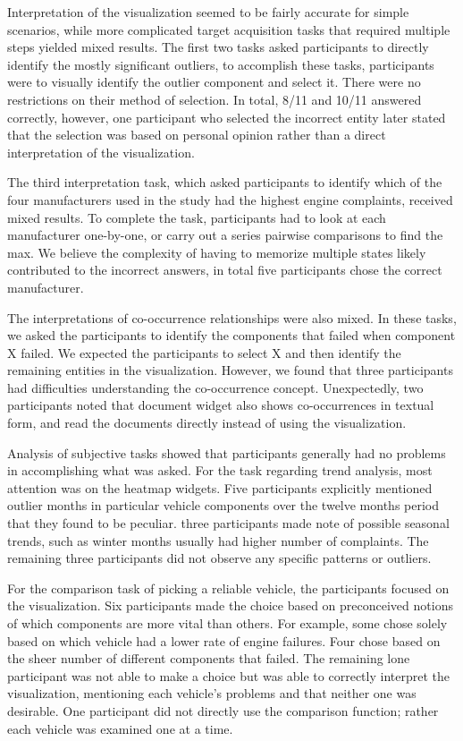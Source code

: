 Interpretation of the \threed visualization seemed to be fairly accurate for
simple scenarios, while more complicated target acquisition tasks that required
multiple steps yielded mixed results. The first two tasks asked
participants to directly identify the mostly significant outliers, to accomplish
these tasks, participants were to visually identify the outlier \threed
component and select it. There were no restrictions on their method of
selection. In total, 8/11 and 10/11 answered correctly, however, one participant
who selected the incorrect entity later stated that the selection was based on
personal opinion rather than a direct interpretation of the visualization.

The third interpretation task, which asked participants to identify which of the four
manufacturers used in the study had the highest engine complaints, received
mixed results. To complete the task, participants had to look at each
manufacturer one-by-one, or carry out a series pairwise comparisons to find the
max. We believe the complexity of having to memorize multiple states likely
contributed to the incorrect answers, in total five participants chose the correct
manufacturer. 

The interpretations of co-occurrence relationships were also mixed. In these
tasks, we asked the participants to identify the components that failed when
component X failed. We expected the participants to select X and then identify
the remaining entities in the visualization. However, we found that three participants
had difficulties understanding the co-occurrence concept. Unexpectedly, two 
participants noted that document widget also shows co-occurrences in textual
form, and read the documents directly instead of using the \threed
visualization.

Analysis of subjective tasks showed that participants generally had no problems
in accomplishing what was asked. For the task regarding trend analysis, most
attention was on the heatmap widgets. Five participants explicitly mentioned
outlier months in particular vehicle components over the twelve months period
that they found to be peculiar. three participants made note of possible seasonal trends,
such as winter months usually had higher number of complaints. The remaining three 
participants did not observe any specific patterns or outliers. 

For the comparison task of picking a reliable vehicle, the participants
focused on the \threed visualization. Six participants made the choice based on
preconceived notions of which components are more vital than others. For example,
some chose solely based on which vehicle had a lower rate of engine failures. Four
chose based on the sheer number of different components that failed. The
remaining lone participant was not able to make a choice but was able to
correctly interpret the visualization, mentioning each vehicle's problems
and that neither one was desirable. One participant did not directly use the
comparison function; rather each vehicle was examined one at a time.


